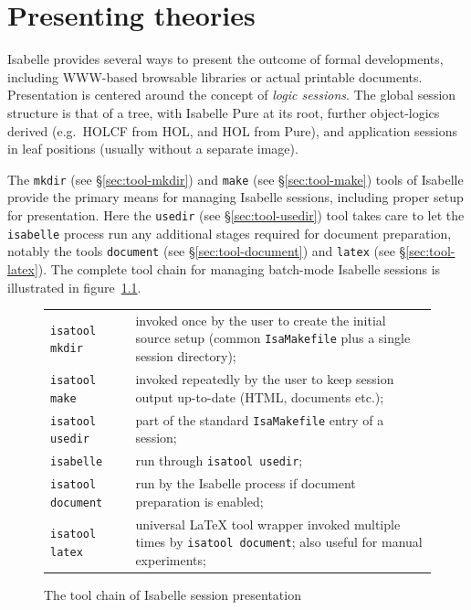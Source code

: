 

\chapter{Presenting theories}\label{ch:present}

Isabelle provides several ways to present the outcome of formal developments,
including WWW-based browsable libraries or actual printable documents.
Presentation is centered around the concept of \emph{logic sessions}.  The
global session structure is that of a tree, with Isabelle Pure at its root,
further object-logics derived (e.g.\ HOLCF from HOL, and HOL from Pure), and
application sessions in leaf positions (usually without a separate image).

The \texttt{mkdir} (see \S\ref{sec:tool-mkdir}) and \texttt{make} (see
\S\ref{sec:tool-make}) tools of Isabelle provide the primary means for
managing Isabelle sessions, including proper setup for presentation.  Here the
\texttt{usedir} (see \S\ref{sec:tool-usedir}) tool takes care to let the
\texttt{isabelle} process run any additional stages required for document
preparation, notably the tools \texttt{document} (see
\S\ref{sec:tool-document}) and \texttt{latex} (see \S\ref{sec:tool-latex}).
The complete tool chain for managing batch-mode Isabelle sessions is
illustrated in figure~\ref{fig:session-tools}.

\begin{figure}[htbp]
  \begin{center}
    \begin{tabular}{lp{}}
      \texttt{isatool mkdir} & invoked once by the user to create the initial
        source setup (common \texttt{IsaMakefile} plus a single session directory); \\
      \texttt{isatool make} & invoked repeatedly by the user to
        keep session output up-to-date (HTML, documents etc.); \\
      \texttt{isatool usedir} & part of the standard \texttt{IsaMakefile} entry of a session; \\
      \texttt{isabelle} & run through \texttt{isatool usedir}; \\
      \texttt{isatool document} & run by the Isabelle process if document preparation is enabled; \\
      \texttt{isatool latex} & universal {\LaTeX} tool wrapper invoked multiple times
        by \texttt{isatool document}; also useful for manual experiments; \\
    \end{tabular}
    \caption{The tool chain of Isabelle session presentation}
    \label{fig:session-tools}
  \end{center}
\end{figure}


